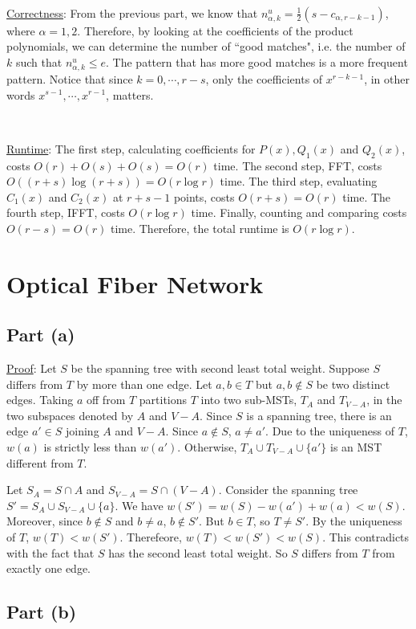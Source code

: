 \documentclass{article}
\begin{document}
~

\noindent\underline{Correctness}: From the previous part, we know that $n^u_{\alpha,k}=\frac{1}{2}(s-c_{\alpha,r-k-1})$, where $\alpha=1,2$. Therefore, by looking at the coefficients of the product polynomials, we can determine the number of ``good matches", i.e. the number of $k$ such that $n^u_{\alpha,k}\leqslant e$. The pattern that has more good matches is a more frequent pattern. Notice that since $k=0,\cdots,r-s$, only the coefficients of $x^{r-k-1}$, in other words $x^{s-1},\cdots,x^{r-1}$, matters.

~

\noindent\underline{Runtime}: The first step, calculating coefficients for $P(x),Q_1(x)$ and $Q_2(x)$, costs $O(r)+O(s)+O(s)=O(r)$ time. The second step, FFT, costs $O((r+s)\log(r+s))=O(r\log r)$ time. The third step, evaluating $C_1(x)$ and $C_2(x)$ at $r+s-1$ points, costs $O(r+s)=O(r)$ time. The fourth step, IFFT, costs $O(r\log r)$ time. Finally, counting and comparing costs $O(r-s)=O(r)$ time. Therefore, the total runtime is $O(r\log r)$.

\section{Optical Fiber Network}
\subsection{Part (a)}
\noindent\underline{Proof}: Let $S$ be the spanning tree with second least total weight. Suppose $S$ differs from $T$ by more than one edge. Let $a,b\in T$ but $a,b\notin S$ be two distinct edges. Taking $a$ off from $T$ partitions $T$ into two sub-MSTs, $T_A$ and $T_{V-A}$, in the two subspaces denoted by $A$ and $V-A$. Since $S$ is a spanning tree, there is an edge $a'\in S$ joining $A$ and $V-A$. Since $a\notin S$, $a\neq a'$. Due to the uniqueness of $T$, $w(a)$ is strictly less than $w(a')$. Otherwise, $T_A\cup T_{V-A}\cup\{a'\}$ is an MST different from $T$.

Let $S_A=S\cap A$ and $S_{V-A}=S\cap(V-A)$. Consider the spanning tree $S'=S_A\cup S_{V-A}\cup\{a\}$. We have $w(S')=w(S)-w(a')+w(a)<w(S)$. Moreover, since $b\notin S$ and $b\neq a$, $b\notin S'$. But $b\in T$, so $T\neq S'$. By the uniqueness of $T$, $w(T)<w(S')$. Therefeore, $w(T)<w(S')<w(S)$. This contradicts with the fact that $S$ has the second least total weight. So $S$ differs from $T$ from exactly one edge.

\subsection{Part (b)}
\end{document}
